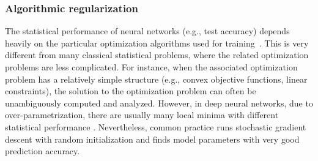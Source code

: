 

\subsubsection{Algorithmic regularization}
The statistical performance of neural networks (e.g., test accuracy) depends heavily on the particular optimization algorithms used for training~\citep{NIPS2017_7003}. This is very different from many classical statistical problems, where the related optimization problems are less complicated. For instance, when the associated optimization problem has a relatively simple structure (e.g., convex objective functions, linear constraints), the solution to the optimization problem can often be unambiguously computed and analyzed. However, in deep neural networks, due to over-parametrization, there are usually many local minima with different statistical performance \citep{li2018visualizing}. Nevertheless, common practice runs stochastic gradient descent with random initialization and finds model parameters with very good prediction accuracy. %



